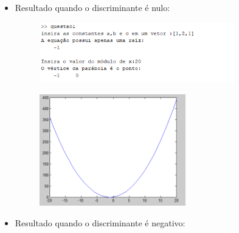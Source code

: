 \documentclass[12pt]{article}
\begin{document}
\begin{itemize}
    \item Resultado quando o discriminante é nulo:
    
    \begin{figure}[H]
        \begin{center}
            \includegraphics[width=0.8\textwidth]{outputq1-2.png}
        \end{center}
    \end{figure}
    \begin{figure}[H]
        \begin{center}
            \includegraphics[width=0.6\textwidth]{graficoq1-2.png}
        \end{center}
    \end{figure}

    \item Resultado quando o discriminante é negativo:
    

\end{itemize}
\end{document}
